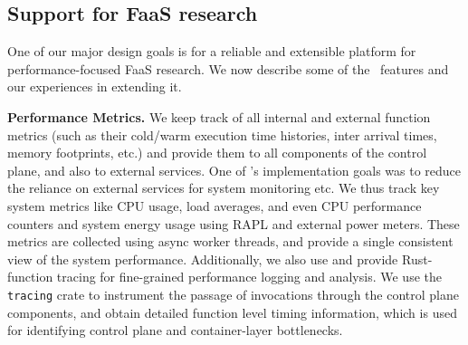 


\subsection{Support for FaaS research}
\label{sec:impl:support}

One of our major design goals is for a reliable and extensible platform for performance-focused FaaS research.
We now describe some of the \sysname~features and our experiences in extending it.


\noindent \textbf{Performance Metrics.}
We keep track of all internal and external function metrics (such as their cold/warm execution time histories, inter arrival times, memory footprints, etc.) and provide them to all components of the control plane, and also to external services.
%
One of \sysname's implementation goals was to reduce the reliance on external services for system monitoring etc.
We thus track key system metrics like CPU usage, load averages, and even CPU performance counters and system energy usage using RAPL and external power meters.
These metrics are collected using async worker threads, and provide a single consistent view of the system performance.
%
Additionally, we also use and provide Rust-function tracing for fine-grained performance logging and analysis.
We use the \texttt{tracing} crate to instrument the passage of invocations through the control plane components, and obtain detailed function level timing information, which is used for identifying control plane and container-layer bottlenecks. 

